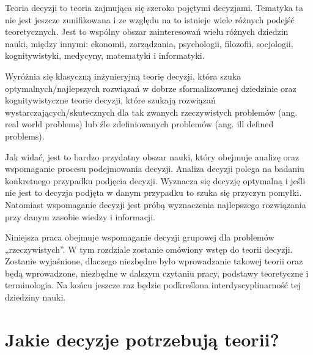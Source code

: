 Teoria decyzji to teoria zajmująca się szeroko pojętymi decyzjami. 
Tematyka ta nie jest jeszcze zunifikowana i ze względu na 
to istnieje wiele różnych podejść teoretycznych. 
Jest to wspólny obszar zainteresowań wielu różnych dziedzin nauki, między 
innymi: ekonomii, zarządzania, psychologii, filozofii, 
socjologii, kognitywistyki, medycyny, matematyki i informatyki.

Wyróżnia się klasyczną inżynieryjną teorię decyzji, która szuka optymalnych/najlepszych 
rozwiązań w dobrze sformalizowanej dziedzinie 
oraz kognitywistyczne teorie decyzji, które szukają rozwiązań wystarczających/skutecznych 
dla tak zwanych rzeczywistych problemów (ang. real world problems) 
lub źle zdefiniowanych problemów (ang. ill defined problems).

Jak widać, jest to bardzo przydatny obszar nauki, który obejmuje analizę oraz wspomaganie 
procesu podejmowania decyzji. 
Analiza decyzji polega na badaniu konkretnego przypadku podjęcia decyzji. Wyznacza 
się decyzję optymalną i jeśli nie jest to decyzja podjęta w danym przypadku to szuka 
się przyczyn pomyłki. Natomiast wspomaganie decyzji jest próbą wyznaczenia najlepszego 
rozwiązania przy danym zasobie wiedzy i informacji.

Niniejsza praca obejmuje wspomaganie decyzji grupowej dla problemów „rzeczywistych”. 
W tym rozdziale zostanie omówiony wstęp do teorii decyzji. 
Zostanie wyjaśnione, dlaczego niezbędne było wprowadzanie takowej teorii oraz będą 
wprowadzone, niezbędne w dalszym czytaniu pracy, 
podstawy teoretyczne i terminologia. Na końcu jeszcze raz będzie podkreślona 
interdyscyplinarność tej dziedziny nauki.

\section{Jakie decyzje potrzebują teorii?}

